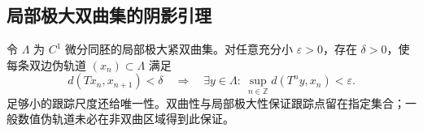 \documentclass[../main.tex]{subfiles}
\begin{document}
\subsection{局部极大双曲集的阴影引理}
令 $\Lambda$ 为 $C^1$ 微分同胚的局部极大紧双曲集。对任意充分小 $\varepsilon>0$，存在 $\delta>0$，使每条双边伪轨道 $(x_n)\subset\Lambda$ 满足
\[
d(Tx_n,x_{n+1})<\delta
\quad\Longrightarrow\quad
\exists y\in\Lambda:\ \sup_{n\in\mathbb Z}d(T^ny,x_n)<\varepsilon.
\]
足够小的跟踪尺度还给唯一性。双曲性与局部极大性保证跟踪点留在指定集合；一般数值伪轨道未必在非双曲区域得到此保证。
\clearpage
\end{document}
